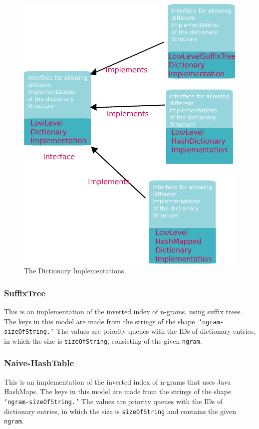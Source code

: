 \begin{figure}[h!]
  
  \centering
    \includegraphics[scale=0.45]{graphics/dictionaryImplementations}
    \caption{The Dictionary Implementations}
   \label{fig:dictionaryClasses}  
\end{figure}

\subsubsection{SuffixTree}  
This is an implementation of the inverted index of n-grams, using suffix trees. The keys in this model are made from the strings of the shape\texttt{ `ngram-sizeOfString.'} The values are priority queues with the IDs of dictionary entries, in which the size is \texttt{sizeOfString}, consisting of the given \texttt{ngram}.

\subsubsection{Naive-HashTable}
This is an implementation of the inverted index of n-grams that uses Java HashMaps. The keys in this model are made from the strings of the shape\texttt{ `ngram-sizeOfString.'} The values are priority queues with the IDs of dictionary entries, in which the size is \texttt{sizeOfString} and contains the given \texttt{ngram}.
  
